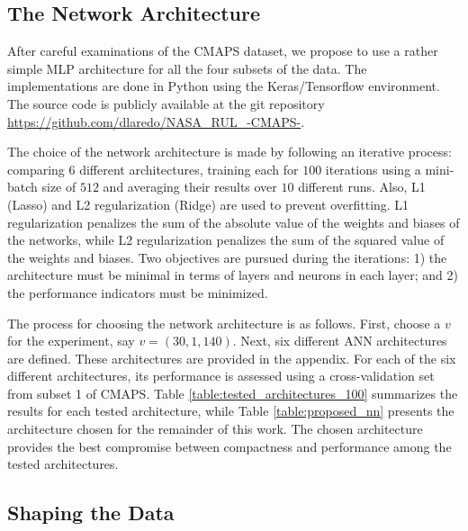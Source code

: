\documentclass[preprint,12pt]{elsarticle}%
\begin{document}
\subsection{The Network Architecture}

After careful examinations of the CMAPS dataset, we propose to use a rather
simple MLP architecture for all the four subsets of the data. The
implementations are done in Python using the Keras/Tensorflow environment. The
source code is publicly available at the git repository \url{https://github.com/dlaredo/NASA_RUL_-CMAPS-}.

The choice of the network architecture is made by following an iterative
process: comparing 6 different architectures, training each for $100$
iterations using a mini-batch size of $512$ and averaging their results over
$10$ different runs. Also, L1 (Lasso) and L2 regularization (Ridge) 
\cite{Buhlmann2011} are used to prevent overfitting. L1 regularization 
penalizes the sum of the absolute value of the weights and biases of the networks, 
while L2 regularization penalizes the sum of the squared value of the weights and biases. 
Two objectives are pursued during the iterations: 1) the architecture must be minimal in 
terms of layers and neurons in each layer; and 2) the performance indicators must be minimized.

The process for choosing the network architecture is as follows. First, choose
a $v$ for the experiment, say $v= (30, 1, 140)$. Next, six different ANN
architectures are defined. These architectures are provided in
the appendix. For each of the six different architectures,
its performance is assessed using a cross-validation set from subset 1 of
CMAPS. Table \ref{table:tested_architectures_100} summarizes the results for
each tested architecture, while Table \ref{table:proposed_nn} presents the
architecture chosen for the remainder of this work. The chosen architecture
provides the best compromise between compactness and performance among the
tested architectures.

\subsection{Shaping the Data}
\end{document}
